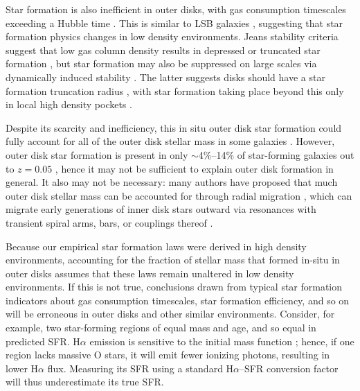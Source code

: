 \documentclass[iop]{emulateapj}
\newcommand{\ha}{H$\alpha$}
\begin{document}
Star formation is also inefficient in outer disks, with gas
consumption timescales exceeding a Hubble time \citep{thilker07,
  bigiel10}.  This is similar to LSB galaxies
\citep[e.g.][]{mcgaugh94a, burkholder01, boissier08}, suggesting that
star formation physics changes in low density environments.  Jeans
stability criteria suggest that low gas column density results in
depressed or truncated star formation \citep[with an apparent
  threshold below around $\Sigma_{HI} \sim 10^{20}$--$10^{21}$
  cm$^{-2}$, e.g.][]{hunter86, skillman87, vanderhulst87}, but star
formation may also be suppressed on large scales via dynamically
induced stability \citep[e.g.][]{zasov88, kennicutt89}. The latter
suggests disks should have a star formation truncation radius
\citep{martin01}, with star formation taking place beyond this only in
local high density pockets \citep[e.g.][]{courtes61, ferguson98a,
  gildepaz05, thilker05}.

Despite its scarcity and inefficiency, this in situ outer disk star
formation could fully account for all of the outer disk stellar mass
in some galaxies \citep[depending on the star formation history,
  SFH;][]{zaritsky07}.  However, outer disk star formation is present
in only $\sim$4\%--14\% of star-forming galaxies out to $z=0.05$
\citep{lemonias11}, hence it may not be sufficient to explain outer
disk formation in general.  It also may not be necessary: many authors
have proposed that much outer disk stellar mass can be accounted for
through radial migration \citep{sellwood02, debattista06}, which can
migrate early generations of inner disk stars outward via resonances
with transient spiral arms, bars, or couplings thereof
\citep[e.g.][]{roskar08, sanchez09, schonrich09, minchev11,
  roskar12}.

Because our empirical star formation laws \citep[e.g. the conversion
  of \ha \ flux to star formation rate, SFR;][]{kennicutt94} were
derived in high density environments, accounting for the fraction of
stellar mass that formed in-situ in outer disks assumes that these
laws remain unaltered in low density environments.  If this is not
true, conclusions drawn from typical star formation indicators about
gas consumption timescales, star formation efficiency, and so on will
be erroneous in outer disks and other similar environments.  Consider,
for example, two star-forming regions of equal mass and age, and so
equal in predicted SFR.  H$\alpha$ emission is sensitive to the initial mass
function \citep[IMF, e.g.][]{sullivan04}; hence, if one region lacks
massive O stars, it will emit fewer ionizing photons, resulting in
lower H$\alpha$ flux.  Measuring its SFR using a standard
H$\alpha$--SFR conversion factor will thus underestimate its true SFR.
\end{document}

